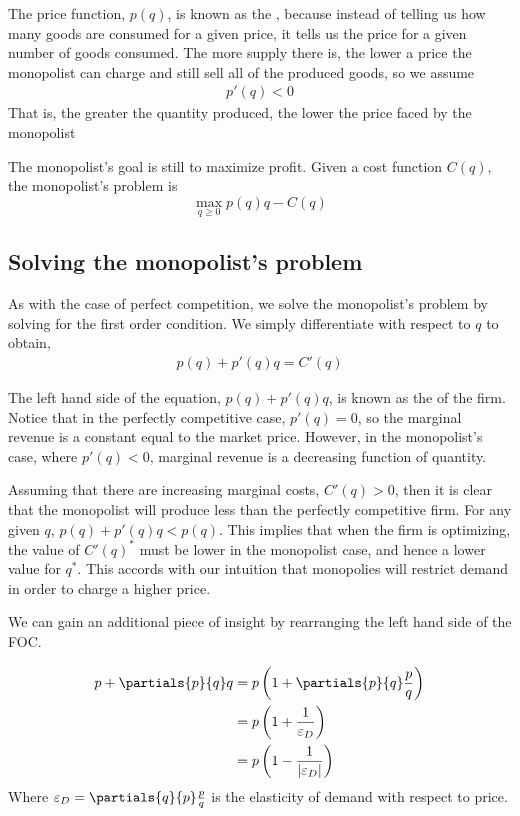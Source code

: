 The price function, $p(q)$, is known as the , because instead of telling us how many goods are consumed for a given price, it tells us the price for a given number of goods consumed. The more supply there is, the lower a price the monopolist can charge and still sell all of the produced goods, so we assume 
\begin{align*}
    p'(q) < 0
\end{align*} 
That is, the greater the quantity produced, the lower the price faced by the monopolist

The monopolist's goal is still to maximize profit. Given a cost function $C(q)$, the monopolist's problem is
\begin{equation*}
    \max_{q \geq 0} p(q) q - C(q)
\end{equation*}

\subsection*{Solving the monopolist's problem}
As with the case of perfect competition, we solve the monopolist's problem by solving for the first order condition. We simply differentiate with respect to $q$ to obtain,
\begin{align*}
    p(q) + p'(q) q = C'(q)
\end{align*}

\begin{definition*} 
    The left hand side of the equation, $p(q) + p'(q) q$, is known as the  of the firm. Notice that in the perfectly competitive case, $p'(q) = 0$, so the marginal revenue is a constant equal to the market price. However, in the monopolist's case, where $p'(q) < 0$, marginal revenue is a decreasing function of quantity. 
\end{definition*}

Assuming that there are increasing marginal costs, $C'(q) > 0$, then it is clear that the monopolist will produce less than the perfectly competitive firm. For any given $q$, $p(q) + p'(q) q < p(q)$. This implies that when the firm is optimizing, the value of $C'(q)^*$ must be lower in the monopolist case, and hence a lower value for $q^*$. This accords with our intuition that monopolies will restrict demand in order to charge a higher price. 

We can gain an additional piece of insight by rearranging the left hand side of the FOC.

\begin{align*}
    p + \partials{p}{q} q &= p \left(1 + \partials{p}{q} \frac{p}{q}\right) \\ 
    &= p \left(1 + \frac{1}{\varepsilon_D}\right) \\
    &= p \left(1 - \frac{1}{|\varepsilon_D|}\right)
\end{align*}
Where $\varepsilon_D = \partials{q}{p}\frac{p}{q}$ is the elasticity of demand with respect to price. 

